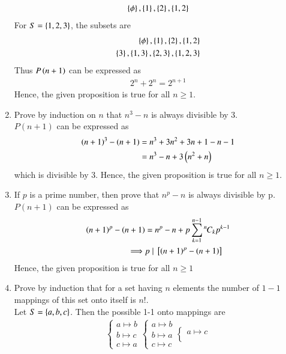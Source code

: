 \begin{enumerate}[label=\arabic*.,ref=\thesubsection.\theenumi]
\begin{align}
	\left\{\phi\right\}, \left\{1\right\}, \left\{2\right\}, \left\{1,2\right\}
\end{align}
For $S = \left\{1,2, 3\right\}$,  the subsets are
\begin{align}
	\left\{\phi\right\}, \left\{1\right\}, \left\{2\right\}, \left\{1,2\right\}
	\\
	\left\{3\right\}, \left\{1,3\right\}, \left\{2,3\right\}, \left\{1,2,3\right\}
\end{align}
Thus $P\left(n+1\right)$ can be expressed as
\begin{align}
	2^n+2^n = 2^{n+1}
\end{align}
Hence, the given proposition is true for all $n \ge 1$.
	\item Prove by induction on $n$ that $n^3-n$ is always divisible by 3.
		\\
		\solution $P(n+1)$ can be expressed as 
		\begin{align}
			\left(n+1\right)^3 -\left(n+1\right) &= n^3 + 3n^2 + 3n +1 -n -1
			\\
			&= n^3-n +3\left(n^2+n\right)
		\end{align}
		which is divisible by 3. Hence, the given proposition is true for all $n \ge 1$.
	\item If $p$ is a prime number, then prove that $n^p -n$ is always divisible by p.
\\
\solution $P(n+1)$ can be expressed as 
		\begin{align}
			\left(n+1\right)^p -\left(n+1\right) &= n^p  -n  + p \sum_{k=1}^{n-1}{{}^{n}\mkern-1muC_{k}}p^{k-1}
			\\
			\implies & p \mid {}\left[\left(n+1\right)^p -\left(n+1\right)\right]
		\end{align}
Hence, the given proposition is true for all $n \ge 1$
\item  Prove by induction that for a set having $n$ elements the number of $1-1$ mappings of this set
	onto itself is $n!$.
	\\
	\solution Let $S = \left\{a, b, c\right\}$.  Then the possible 1-1 onto mappings are
	\begin{align}
	\begin{cases}
a\mapsto b\\
b\mapsto c\\
c\mapsto a
\end{cases}
\begin{cases}
a\mapsto b\\
b\mapsto a\\
c\mapsto c
\end{cases}
\begin{cases}
a\mapsto c\\

\end{cases}
\end{align}
\end{enumerate}
